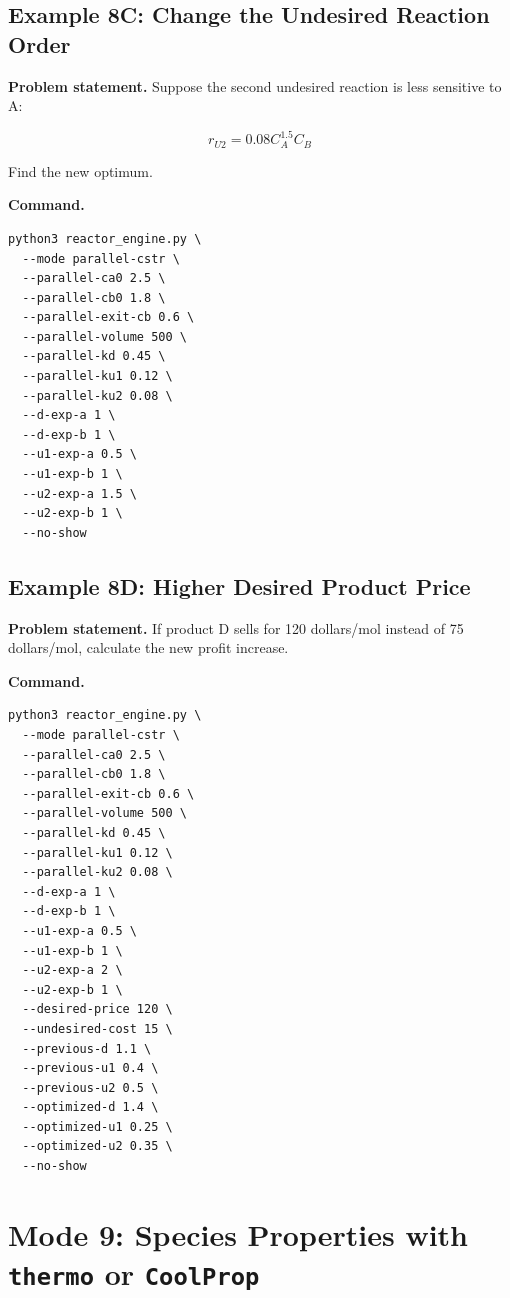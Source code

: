 \documentclass[11pt]{article}
\begin{document}
\subsection{Example 8C: Change the Undesired Reaction Order}

\textbf{Problem statement.} Suppose the second undesired reaction is less sensitive to A:

\begin{equation}
r_{U2}=0.08C_A^{1.5}C_B
\end{equation}

Find the new optimum.

\textbf{Command.}

\begin{lstlisting}
python3 reactor_engine.py \
  --mode parallel-cstr \
  --parallel-ca0 2.5 \
  --parallel-cb0 1.8 \
  --parallel-exit-cb 0.6 \
  --parallel-volume 500 \
  --parallel-kd 0.45 \
  --parallel-ku1 0.12 \
  --parallel-ku2 0.08 \
  --d-exp-a 1 \
  --d-exp-b 1 \
  --u1-exp-a 0.5 \
  --u1-exp-b 1 \
  --u2-exp-a 1.5 \
  --u2-exp-b 1 \
  --no-show
\end{lstlisting}

\subsection{Example 8D: Higher Desired Product Price}

\textbf{Problem statement.} If product D sells for 120 dollars/mol instead of 75 dollars/mol, calculate the new profit increase.

\textbf{Command.}

\begin{lstlisting}
python3 reactor_engine.py \
  --mode parallel-cstr \
  --parallel-ca0 2.5 \
  --parallel-cb0 1.8 \
  --parallel-exit-cb 0.6 \
  --parallel-volume 500 \
  --parallel-kd 0.45 \
  --parallel-ku1 0.12 \
  --parallel-ku2 0.08 \
  --d-exp-a 1 \
  --d-exp-b 1 \
  --u1-exp-a 0.5 \
  --u1-exp-b 1 \
  --u2-exp-a 2 \
  --u2-exp-b 1 \
  --desired-price 120 \
  --undesired-cost 15 \
  --previous-d 1.1 \
  --previous-u1 0.4 \
  --previous-u2 0.5 \
  --optimized-d 1.4 \
  --optimized-u1 0.25 \
  --optimized-u2 0.35 \
  --no-show
\end{lstlisting}


\section{Mode 9: Species Properties with \texttt{thermo} or \texttt{CoolProp}}
\end{document}
